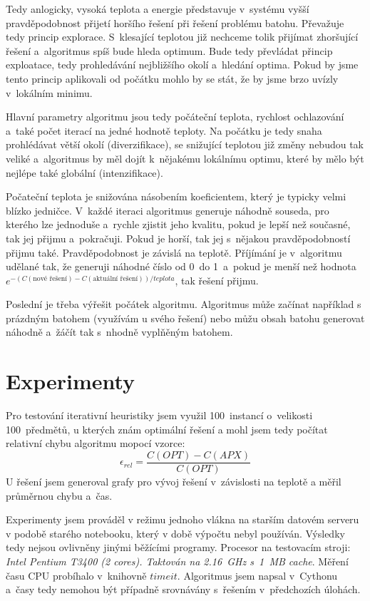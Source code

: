 \documentclass[11pt]{article}
\begin{document}
Tedy anlogicky, vysoká teplota a energie představuje v~systému vyšší pravděpodobnost přijetí horšího řešení při řešení problému batohu. Převažuje tedy princip explorace. S~klesající teplotou již nechceme tolik přijímat zhoršující řešení a~algoritmus spíš bude hleda optimum. Bude tedy převládat přincip exploatace, tedy prohledávání nejbližšího okolí a~hledání optima. Pokud by jsme tento princip aplikovali od počátku mohlo by se stát, že by jsme brzo uvízly v~lokálním minimu. 

Hlavní parametry algoritmu jsou tedy počáteční teplota, rychlost ochlazování a~také počet iterací na jedné hodnotě teploty. Na počátku je tedy snaha prohlédávat větší okolí (diverzifikace), se snižující teplotou již změny nebudou tak veliké a~algoritmus by měl dojít k~nějakému lokálnímu optimu, které by mělo být nejlépe také globální (intenzifikace). 

Počateční teplota je snižována násobením koeficientem, který je typicky velmi blízko jedničce. V~každé iteraci algoritmus generuje náhodně souseda, pro kterého lze jednoduše a~rychle zjistit jeho kvalitu, pokud je lepší než současné, tak jej přijmu a~pokračuji. Pokud je horší, tak jej s~nějakou pravděpodobností přijmu také. Pravděpodobnost je závislá na teplotě. Příjímání je v~algoritmu udělané tak, že generuji náhodné číslo od 0~do 1~a~pokud je menší než hodnota $ e^{-(C(\text{nové řešení})-C(\text{aktuální řešení}))/teplota}$, tak řešení přijmu.

Poslední je třeba výřešit počátek algoritmu. Algoritmus může začínat například s prázdným batohem (využívám u svého řešení) nebo můžu obsah batohu generovat náhodně a~žáčít tak s~nhodně vyplňěným batohem.

\section{Experimenty}
Pro testování iterativní heuristiky jsem využil 100~instancí o~velikosti 100~předmětů, u kterých znám optimální řešení a mohl jsem tedy počítat relativní chybu algoritmu mopocí vzorce: $$\epsilon_{rel} = \frac{C(OPT)-C(APX)}{C(OPT)}$$ U řešení jsem generoval grafy pro vývoj řešení v~závislosti na teplotě a měřil průměrnou chybu a~čas.

Experimenty jsem prováděl v režimu jednoho vlákna na starším datovém serveru v podobě starého notebooku, který v době výpočtu nebyl používán. Výsledky tedy nejsou ovlivněny jinými běžícími programy. Procesor na testovacím stroji: \textit{Intel Pentium T3400 (2 cores). Taktován na 2.16~GHz s~1~MB cache}.
Měření času CPU probíhalo v~knihovně $timeit$. Algoritmus jsem napsal v~Cythonu a~časy tedy nemohou být případně srovnávány s~řešením v~předchozích úlohách.
\end{document}

